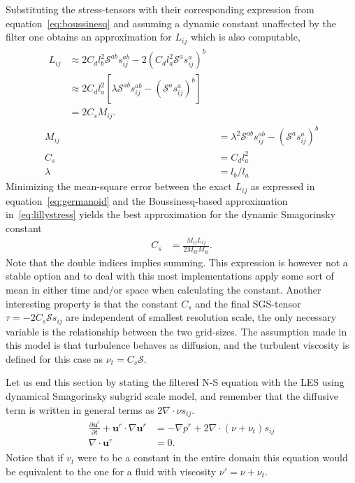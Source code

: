 Substituting the stress-tensors with their corresponding expression 
from equation~\ref{eq:boussinesq} and assuming a dynamic constant unaffected by the filter 
one obtains an approximation for $L_{ij}$ which is also computable,
\begin{align}
    \begin{split}
L_{ij} &\approx 2C_d l_b^2 \mathcal{S}^{ab} s^{ab}_{ij}
        -2 (C_d l_a^2 \mathcal{S}^a s^a_{ij})^b\\
        &\approx 2C_dl_a^2[\lambda\mathcal{S}^{ab}s^{ab}_{ij} 
        - (\mathcal{S}^{a}s^{a}_{ij})^b]\\
        &= 2C_s M_{ij}.
        \label{eq:lillystress}
    \end{split} \\
    M_{ij} &= \lambda^{2}\mathcal{S}^{ab}s_{ij}^{ab} - (\mathcal{S}^as_{ij}^a)^b\\
        C_s &= C_dl_a^2\\
        \lambda &= l_b/l_a
    \label{eq:dynsmagderivation}
\end{align}
Minimizing the mean-square error between the exact $L_{ij}$ as expressed in 
equation~\ref{eq:germanoid} and the Boussinesq-based approximation 
in~\ref{eq:lillystress} yields the best approximation 
for the dynamic Smagorinsky constant 
%
\begin{align}
    C_s &= \frac{M_{ij}L_{ij}}{2M_{kl}M_{kl}}.
    \label{eq:dynsmag}
\end{align}
%
Note that the double indices implies summing. This expression is however not a 
stable option and to deal with this most implementations apply some sort of mean 
in either time and/or space when calculating the constant. Another interesting property 
is that the constant $C_s$ and the final SGS-tensor $\tau = -2C_s\mathcal{S}s_{ij}$ are 
independent of smallest resolution scale, the only necessary variable is the relationship 
between the two grid-sizes. The assumption made in this model is that turbulence behaves 
as diffusion, and the turbulent viscosity is defined for this case as $\nu_t = C_s\mathcal{S}$.

Let us end this section by stating the filtered N-S equation with the LES using 
dynamical Smagorinsky subgrid scale model, and remember that the diffusive term is written 
in general terms as $2\nabla \cdot \nu s_{ij}$.  
%
\begin{align}
    \begin{split}
        \frac{\partial \mathbf{u}^r}{\partial t} + \mathbf{u}^r\cdot \nabla\mathbf{u}^r
        &= -\nabla p^r +2\nabla \cdot (\nu + \nu_t) s_{ij} \\
        \nabla \cdot \mathbf{u}^r &= 0.
    \end{split}
	\label{eq:NSLES}
\end{align}
%
Notice that if $v_t$ were to be a constant in the entire domain this equation would 
be equivalent to the one for a fluid with viscosity $\nu'= \nu + \nu_t$.

